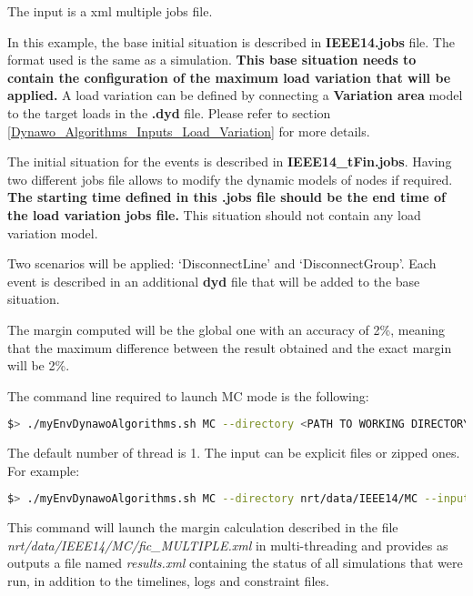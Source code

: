 \documentclass[a4paper, 12pt]{report}
\begin{document}
The input is a xml multiple jobs file.



In this example, the base initial situation is described in \textbf{IEEE14.jobs} file. The format used is the same as a \Dynawo simulation.
\textbf{This base situation needs to contain the configuration of the maximum load variation that will be applied.}
A load variation can be defined by connecting a \textbf{Variation area} model to the target loads in the \textbf{.dyd} file. 
Please refer to section \ref{Dynawo_Algorithms_Inputs_Load_Variation} for more details.

The initial situation for the events is described in \textbf{IEEE14\_tFin.jobs}. Having two different jobs file allows to modify the dynamic models of nodes if required. 
\textbf{The starting time defined in this .jobs file should be the end time of the load variation jobs file.}
This situation should not contain any load variation model. 

Two scenarios will be applied: `DisconnectLine' and `DisconnectGroup'. 
Each event is described in an additional \textbf{dyd} file that will be added to the base situation. 

The margin computed will be the global one with an accuracy of 2\%, meaning that the maximum difference between the result obtained and the exact margin will be 2\%.

The command line required to launch MC mode is the following:

\begin{lstlisting}[language=bash, breaklines=true, breakatwhitespace=false]
$> ./myEnvDynawoAlgorithms.sh MC --directory <PATH TO WORKING DIRECTORY> --input <NAME OF INPUT FILE> --output <NAME OF OUTPUT FILE> --nbThreads <NUMBER OF THREADS>
\end{lstlisting}

The default number of thread is 1. The input can be explicit files or zipped ones. For example:

\begin{lstlisting}[language=bash, breaklines=true, breakatwhitespace=false]
$> ./myEnvDynawoAlgorithms.sh MC --directory nrt/data/IEEE14/MC --input fic_MULTIPLE.xml --output results.xml --nbThreads 2
\end{lstlisting}

This command will launch the margin calculation described in the file \textit{nrt/data/IEEE14/MC/fic\_MULTIPLE.xml} in multi-threading 
and provides as outputs a file named \textit{results.xml} containing the status of all simulations that were run, 
in addition to the timelines, logs and constraint files.\\
\end{document}
